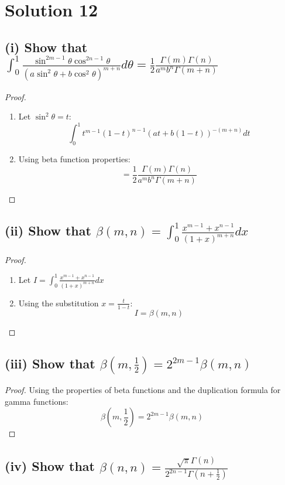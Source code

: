 \documentclass{article}
\begin{document}
\section*{Solution 12}

\subsection*{(i) Show that $\int_0^1 \frac{\sin^{2m-1}\theta \cos^{2n-1}\theta}{(a\sin^2\theta + b\cos^2\theta)^{m+n}}d\theta = \frac{1}{2}\frac{\Gamma(m)\Gamma(n)}{a^mb^n\Gamma(m+n)}$}

\begin{proof}
\begin{enumerate}
\item Let $\sin^2\theta = t$:
\[ \int_0^1 t^{m-1}(1-t)^{n-1}(at+b(1-t))^{-(m+n)}dt \]

\item Using beta function properties:
\[ = \frac{1}{2}\frac{\Gamma(m)\Gamma(n)}{a^mb^n\Gamma(m+n)} \]
\end{enumerate}
\end{proof}

\subsection*{(ii) Show that $\beta(m,n) = \int_0^1 \frac{x^{m-1} + x^{n-1}}{(1+x)^{m+n}}dx$}

\begin{proof}
\begin{enumerate}
\item Let $I = \int_0^1 \frac{x^{m-1} + x^{n-1}}{(1+x)^{m+n}}dx$

\item Using the substitution $x = \frac{t}{1-t}$:
\[ I = \beta(m,n) \]
\end{enumerate}
\end{proof}

\subsection*{(iii) Show that $\beta(m,\frac{1}{2}) = 2^{2m-1}\beta(m,n)$}

\begin{proof}
Using the properties of beta functions and the duplication formula for gamma functions:
\[ \beta(m,\frac{1}{2}) = 2^{2m-1}\beta(m,n) \]
\end{proof}

\subsection*{(iv) Show that $\beta(n,n) = \frac{\sqrt{\pi}\Gamma(n)}{2^{2n-1}\Gamma(n+\frac{1}{2})}$}
\end{document}
